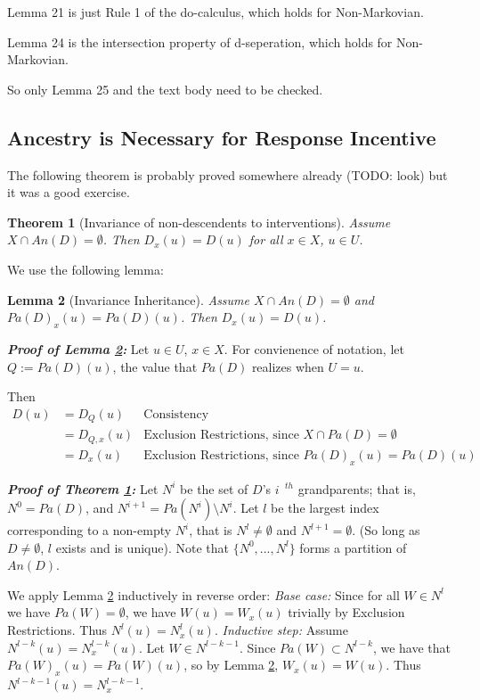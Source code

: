 \documentclass[letterpaper,10pt]{article}
\newtheorem{theorem}{Theorem}
\newtheorem{lemma}[theorem]{Lemma}
\begin{document}
Lemma 21 is just Rule 1 of the do-calculus, which holds for Non-Markovian.

Lemma 24 is the intersection property of d-seperation, which holds for Non-Markovian.

So only Lemma 25 and the text body need to be checked.


\subsection{Ancestry is Necessary for Response Incentive}
The following theorem is probably proved somewhere already \color{red} (TODO: look) \color{black} but it was a good exercise.

\begin{theorem}[Invariance of non-descendents to interventions]\label{invariance}
Assume $X\cap An(D)=\emptyset$. Then $D_x(u)=D(u)$ for all $x\in X$, $u\in U$.
\end{theorem}

We use the following lemma:
\begin{lemma}[Invariance Inheritance]\label{inheritance}
Assume $X\cap An(D)=\emptyset$ and $Pa(D)_x(u) = Pa(D)(u)$. Then $D_x(u)=D(u)$.
\end{lemma}

\textbf{\emph{Proof of Lemma \ref{inheritance}:}}
Let $u\in U$, $x\in X$. For convienence of notation, let $Q:=Pa(D)(u)$, the value that $Pa(D)$ realizes when $U=u$.

Then
\begin{align*}
D(u)&=D_Q(u) &\text{Consistency} \\
&=D_{Q,x}(u) &\text{Exclusion Restrictions, since }X\cap Pa(D)=\emptyset \\
&= D_x(u) &\text{Exclusion Restrictions, since }Pa(D)_x(u) = Pa(D)(u)
\end{align*}

\textbf{\emph{Proof of Theorem \ref{invariance}:}}
Let $N^i$ be the set of $D$'s $i^{\text{ }th}$ grandparents; that is, $N^0=Pa(D)$, and $N^{i+1}=Pa(N^i)\setminus N^i$. Let $l$ be the largest index corresponding to a non-empty $N^i$, that is $N^l\neq \emptyset$ and $N^{l+1}=\emptyset$. (So long as $D\neq\emptyset$, $l$ exists and is unique). Note that $\{N^0,...,N^l\}$ forms a partition of $An(D)$.

We apply Lemma \ref{inheritance} inductively in reverse order: \emph{Base case:} Since for all $W\in N^l$ we have $Pa(W)=\emptyset$, we have $W(u)=W_x(u)$ trivially by Exclusion Restrictions. Thus $N^l(u)=N_x^l(u)$. \emph{Inductive step:} Assume $N^{l-k}(u)=N_x^{l-k}(u)$. Let $W\in N^{l-k-1}$. Since $Pa(W)\subset N^{l-k}$, we have that $Pa(W)_x(u)=Pa(W)(u)$, so by Lemma \ref{inheritance}, $W_x(u)=W(u)$. Thus $N^{l-k-1}(u)=N_x^{l-k-1}$.
\end{document}
